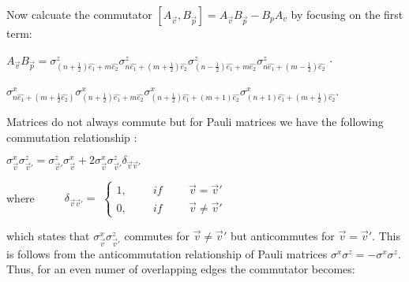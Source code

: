 \documentclass{Configuration_Files/PoliMi3i_thesis}
\begin{document}

Now calcuate the commutator $[A_{\vec{v}},B_{\vec{p}}] = A_{\vec{v}}B_{\vec{p}} - B_{p}A_{v}$ by focusing on the first term: \newline

\begin{center}
	
	$ A_{\vec{v}}B_{\vec{p}} =
	\sigma^z_{(n+\frac{1}{2})\hat{e_1} + m\hat{e_2}} \sigma^z_{n\hat{e_1}+(m+\frac{1}{2})\hat{e_2}} \sigma^z_{(n-\frac{1}{2})\hat{e_1} + m\hat{e_2}} \sigma^z_{n\hat{e_1}+(m-\frac{1}{2})\hat{e_2}} $ $\cdot$
	
	$\sigma^x_{n\hat{e_1} + (m+\frac{1}{2}\hat{e_2})} \sigma^x_{(n+ \frac{1}{2})\hat{e_1} + m\hat{e_2}} \sigma^x_{(n+ \frac{1}{2})\hat{e_1} + (m + 1)\hat{e_2}} \sigma^x_{(n+ 1)\hat{e_1} + (m + \frac{1}{2})\hat{e_2}}$. \newline
	
\end{center}


Matrices do not always commute but for Pauli matrices we have the following commutation relationship :
\newline

\begin{center}
	$\sigma^x_{\vec{v}}\sigma^z_{\vec{v}'} = \sigma^z_{\vec{v}'} \sigma^x_{\vec{v}} + 2 \sigma^x_{\vec{v}}\sigma^z_{\vec{v}'} \delta_{\vec{v} \vec{v}'}$\newline
\end{center}

where $\hspace{1cm} \delta_{\vec{v} \vec{v}'} =$
$\begin{cases}
	1, \hspace{1cm} if \hspace{1cm}  \vec{v} = \vec{v}'\\
	0, \hspace{1cm} if \hspace{1cm} \vec{v} \neq \vec{v}'
\end{cases}$\newline

which states that 	$\sigma^x_{\vec{v}}\sigma^z_{\vec{v}'}$ commutes for $\vec{v} \neq \vec{v}'$   but anticommutes for $\vec{v} = \vec{v}'$. This is follows from the anticommutation relationship of Pauli matrices $\sigma^x \sigma^z = - \sigma^x \sigma^z$. Thus, for an even numer of overlapping edges the commutator becomes:\newline
\end{document}
